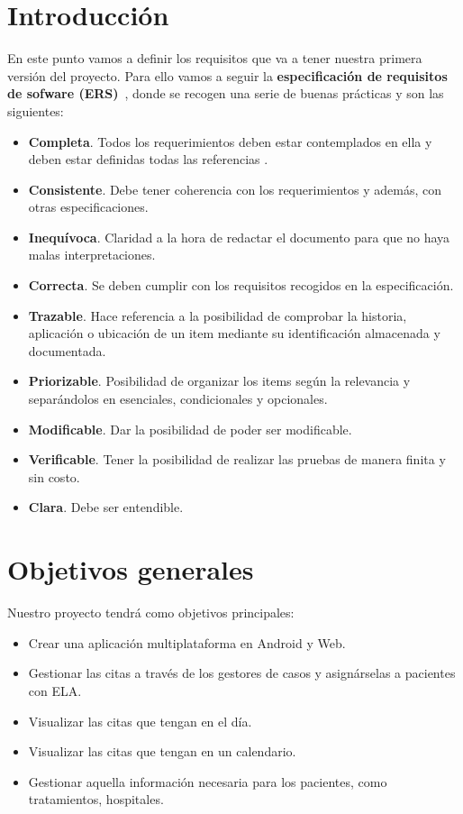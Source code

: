 
\section{Introducción}

En este punto vamos a definir los requisitos que va a tener nuestra primera versión del proyecto. Para ello vamos a seguir la \textbf{especificación de requisitos de sofware (ERS)}~\cite{wiki:ieee830-1998}, donde se recogen una serie de buenas prácticas y son las siguientes:
\begin{itemize}
\tightlist 
\item \textbf{Completa}. Todos los requerimientos deben estar contemplados en ella y deben estar definidas todas las referencias .
\item \textbf{Consistente}. Debe tener coherencia con los requerimientos y además, con otras especificaciones.
\item \textbf{Inequívoca}. Claridad a la hora de redactar el documento para que no haya malas interpretaciones.
\item \textbf{Correcta}. Se deben cumplir con los requisitos recogidos en la especificación.
\item \textbf{Trazable}. Hace referencia a la posibilidad de comprobar la historia, aplicación o ubicación de un item mediante su identificación almacenada y documentada.
\item \textbf{Priorizable}. Posibilidad de organizar los items según la relevancia y separándolos en esenciales, condicionales y opcionales.
\item \textbf{Modificable}. Dar la posibilidad de poder ser modificable.
\item \textbf{Verificable}. Tener la posibilidad de realizar las pruebas de manera finita y sin costo.
\item \textbf{Clara}. Debe ser entendible.
\end{itemize}

\section{Objetivos generales}
Nuestro proyecto tendrá como objetivos principales:
\begin{itemize}
\tightlist 
\item Crear una aplicación multiplataforma en Android y Web.
\item Gestionar las citas a través de los gestores de casos y asignárselas a pacientes con ELA.
\item Visualizar las citas que tengan en el día.
\item Visualizar las citas que tengan en un calendario.
\item Gestionar aquella información necesaria para los pacientes, como tratamientos, hospitales.
\end{itemize}

